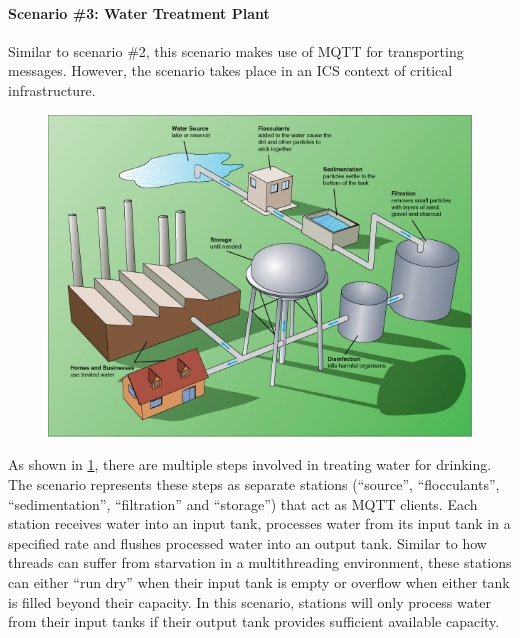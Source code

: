 \paragraph{Scenario \#3: Water Treatment Plant} Similar to scenario \#2, this scenario makes use of \ac{MQTT} for transporting messages. However, the scenario takes place in an \ac{ICS} context of critical infrastructure.

\begin{figure}[ht]
    \centering
    \includegraphics[width=12cm]{img/ch04/watertreatmentplant.png}
    \label{fig:water-treatment}
\end{figure}

As shown in \ref{fig:water-treatment}, there are multiple steps involved in treating water for drinking. The scenario represents these steps as separate stations (\enquote{source}, \enquote{flocculants}, \enquote{sedimentation}, \enquote{filtration} and \enquote{storage}) that act as \ac{MQTT} clients. Each station receives water into an input tank, processes water from its input tank in a specified rate and flushes processed water into an output tank. Similar to how threads can suffer from starvation in a multithreading environment, these stations can either \enquote{run dry} when their input tank is empty or overflow when either tank is filled beyond their capacity. In this scenario, stations will only process water from their input tanks if their output tank provides sufficient available capacity.

